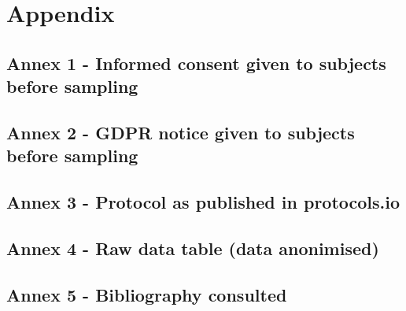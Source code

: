 \documentclass[fontsize=12pt,twoside=semi,openright,numbers=noenddot,parskip=half]{scrbook}
\begin{document}
\part{Appendix}\appendix
\chapter{Annex 1 - Informed consent given to subjects before sampling}

\clearpage\appendix\chapter{Annex 2 - GDPR notice given to subjects before sampling}

\chapter{Annex 3 - Protocol as published in protocols.io}

\clearpage\appendix\chapter{Annex 4 - Raw data table (data anonimised)}

\chapter{Annex 5 - Bibliography consulted}

\end{document}

